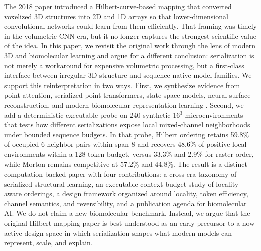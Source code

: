 The 2018 paper \citet{corcoran2018spatial} introduced a Hilbert-curve-based mapping that converted voxelized 3D structures into 2D and 1D arrays so that lower-dimensional convolutional networks could learn from them efficiently. That framing was timely in the volumetric-CNN era, but it no longer captures the strongest scientific value of the idea. In this paper, we revisit the original work through the lens of modern 3D and biomolecular learning and argue for a different conclusion: serialization is not merely a workaround for expensive volumetric processing, but a first-class interface between irregular 3D structure and sequence-native model families. We support this reinterpretation in two ways. First, we synthesize evidence from point attention, serialized point transformers, state-space models, neural surface reconstruction, and modern biomolecular representation learning \citep{zhao2021pointtransformer, wu2024ptv3, liang2024pointmamba, zhang2024voxelmamba, li2025noksr, park2025atomae}. Second, we add a deterministic executable probe on 240 synthetic 16$^3$ microenvironments that tests how different serializations expose local mixed-channel neighborhoods under bounded sequence budgets. In that probe, Hilbert ordering retains 59.8\% of occupied 6-neighbor pairs within span 8 and recovers 48.6\% of positive local environments within a 128-token budget, versus 33.3\% and 2.9\% for raster order, while Morton remains competitive at 57.2\% and 44.8\%. The result is a distinct computation-backed paper with four contributions: a cross-era taxonomy of serialized structural learning, an executable context-budget study of locality-aware orderings, a design framework organized around locality, token efficiency, channel semantics, and reversibility, and a publication agenda for biomolecular AI. We do not claim a new biomolecular benchmark. Instead, we argue that the original Hilbert-mapping paper is best understood as an early precursor to a now-active design space in which serialization shapes what modern models can represent, scale, and explain.
